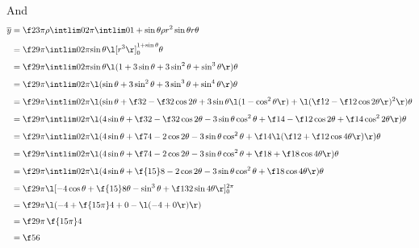 \documentclass[a4paper]{article}
\begin{document}
And \begin{align*}
\overline y &= \f2{3\pi\rho} \intlim 0{2\pi} {\intlim 0 {1 + \sin \theta} {\rho r^2 \sin \theta} r} \theta\\[1ex]
&= \f2{9\pi} \intlim 0{2\pi} {\sin \theta \l[r^3\r]_0^{1 + \sin\theta}} \theta\\[1ex]
&= \f2{9\pi} \intlim 0{2\pi} {\sin \theta \l( 1 + 3\sin\theta + 3\sin^2 \theta + \sin^3 \theta \r)} \theta\\[1ex]
&= \f2{9\pi} \intlim 0{2\pi} {\l( \sin\theta + 3\sin^2 \theta + 3\sin^3 \theta + \sin^4 \theta \r)} \theta\\[1ex]
&= \f2{9\pi} \intlim 0{2\pi} {\l( \sin\theta + \f32 - \f32 \cos 2\theta + 3 \sin \theta \l(1 - \cos^2 \theta\r) + \l( \f12 - \f12 \cos 2\theta \r)^2 \r)} \theta\\[1ex]
&= \f2{9\pi} \intlim 0{2\pi} {\l( 4 \sin\theta + \f32 - \f32 \cos 2\theta - 3 \sin\theta \cos^2 \theta + \f14 - \f12 \cos 2\theta + \f14 \cos^2 2\theta \r)} \theta\\[1ex]
&= \f2{9\pi} \intlim 0{2\pi} {\l( 4 \sin\theta + \f74 - 2 \cos 2\theta - 3 \sin\theta \cos^2 \theta + \f14 \l( \f12 + \f12 \cos 4\theta \r) \r)} \theta\\[1ex]
&= \f2{9\pi} \intlim 0{2\pi} {\l( 4 \sin\theta + \f74 - 2 \cos 2\theta - 3 \sin\theta \cos^2 \theta + \f18 + \f18 \cos 4\theta \r)} \theta\\[1ex]
&= \f2{9\pi} \intlim 0{2\pi} {\l( 4 \sin\theta + \f{15}8 - 2 \cos 2\theta - 3 \sin\theta \cos^2 \theta + \f18 \cos 4\theta \r)} \theta\\[1ex]
&= \f2{9\pi} \l[ -4\cos\theta + \f{15}8 \theta - \sin^3 \theta + \f1{32}\sin 4\theta \r]_0^{2\pi}\\[1ex]
&= \f2{9\pi} \l( -4 + \f{15\pi}4 + 0 - \l( -4 + 0 \r) \r)\\[1ex]
&= \f2{9\pi} \, \f{15\pi}4\\[1ex]
&= \f56
\end{align*}



\subsection{~}

\end{document}
